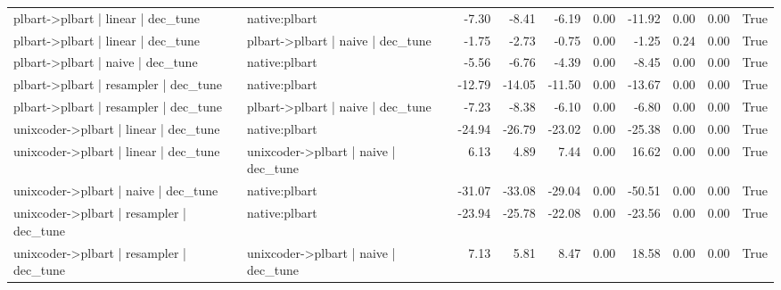 \begin{tabular}{llrrrrrrrr}
plbart->plbart | linear | dec_tune & native:plbart & -7.30 & -8.41 & -6.19 & 0.00 & -11.92 & 0.00 & 0.00 & True \\
plbart->plbart | linear | dec_tune & plbart->plbart | naive | dec_tune & -1.75 & -2.73 & -0.75 & 0.00 & -1.25 & 0.24 & 0.00 & True \\
plbart->plbart | naive | dec_tune & native:plbart & -5.56 & -6.76 & -4.39 & 0.00 & -8.45 & 0.00 & 0.00 & True \\
plbart->plbart | resampler | dec_tune & native:plbart & -12.79 & -14.05 & -11.50 & 0.00 & -13.67 & 0.00 & 0.00 & True \\
plbart->plbart | resampler | dec_tune & plbart->plbart | naive | dec_tune & -7.23 & -8.38 & -6.10 & 0.00 & -6.80 & 0.00 & 0.00 & True \\
unixcoder->plbart | linear | dec_tune & native:plbart & -24.94 & -26.79 & -23.02 & 0.00 & -25.38 & 0.00 & 0.00 & True \\
unixcoder->plbart | linear | dec_tune & unixcoder->plbart | naive | dec_tune & 6.13 & 4.89 & 7.44 & 0.00 & 16.62 & 0.00 & 0.00 & True \\
unixcoder->plbart | naive | dec_tune & native:plbart & -31.07 & -33.08 & -29.04 & 0.00 & -50.51 & 0.00 & 0.00 & True \\
unixcoder->plbart | resampler | dec_tune & native:plbart & -23.94 & -25.78 & -22.08 & 0.00 & -23.56 & 0.00 & 0.00 & True \\
unixcoder->plbart | resampler | dec_tune & unixcoder->plbart | naive | dec_tune & 7.13 & 5.81 & 8.47 & 0.00 & 18.58 & 0.00 & 0.00 & True \\
\bottomrule
\end{tabular}
